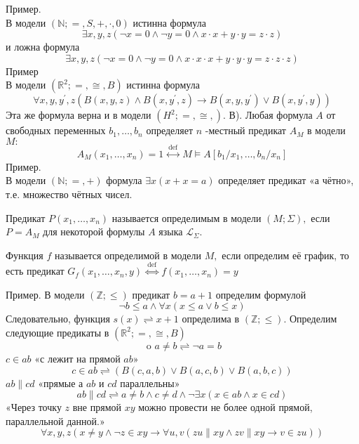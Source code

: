 \vskip 0.2in
Пример.\\
В модели $(\mathbb{N} ;=, S,+, \cdot, 0)$ истинна формула
$$\exists x, y, z(\neg x=0 \wedge \neg y=0 \wedge x \cdot x+y \cdot y=z \cdot z)$$
и ложна формула 
$$\exists x, y, z(\neg x=0 \wedge \neg y=0 \wedge x \cdot x \cdot x+y \cdot y \cdot y=z \cdot z \cdot z)$$
\vskip 0.2in
Пример\\
В модели $\left(\mathbb{R}^{2} ;=, \cong, B\right)$ истинна формула
$$\forall x, y, y^{\prime}, z\left(B(x, y, z) \wedge B\left(x, y^{\prime}, z\right) \rightarrow B\left(x, y, y^{\prime}\right) \vee B\left(x, y^{\prime}, y\right)\right)$$
Эта же формула верна и в модели $\left(H^{2} ;=, \cong,\right)$. В).
\vskip 0.2in
Любая формула $A$ от свободных переменных $b_{1}, \ldots, b_{n}$ определяет $n$ -местный предикат $A_{M}$ в модели $M:$
$$
A_{M}\left(x_{1}, \ldots, x_{n}\right)=1 \stackrel{\text { def }}{\longleftrightarrow} M \vDash A\left[b_{1} / x_{1}, \ldots, b_{n} / x_{n}\right]
$$
Пример.\\
В модели $(\mathbb{N} ;=,+)$ формула $\exists x(x+x=a)$ определяет предикат «а чётно», т.е. множество чётных чисел.
\vskip 0.2in
\begin{defn}
Предикат $P\left(x_{1}, \ldots, x_{n}\right)$ называется определимым в модели $(M ; \Sigma),$ если $P=A_{M}$ для некоторой формулы $A$ языка $\mathcal{L}_{\Sigma}$.
\end{defn}
\begin{defn}
Функция $f$ называется определимой в модели $M,$ если определим её график, то есть предикат $G_{f}\left(x_{1}, \ldots, x_{n}, y\right) \stackrel{\text { def }}{\Longleftrightarrow} f\left(x_{1}, \ldots, x_{n}\right)=y$
\end{defn}
\vskip 0.2in
Пример.
В модели $(\mathbb{Z} ; \leqslant)$ предикат $b=a+1$ определим формулой
$$
\neg b \leqslant a \wedge \forall x(x \leqslant a \vee b \leqslant x)
$$
Следовательно, функция $s(x) \rightleftharpoons x+1$ определима в $(\mathbb{Z} ; \leqslant)$.
\vskip 0.2in
Определим следующие предикаты в $\left(\mathbb{R}^{2} ;=, \cong, B\right)$
$$
\text { o } a \neq b \rightleftharpoons \neg a=b
$$
$c \in ab$ «с лежит на прямой $ab$»
$$
c \in a b \rightleftharpoons(B(c, a, b) \vee B(a, c, b) \vee B(a, b, c))
$$
$ab\|cd$ «прямые а $a b$ и $c d$ параллельны»
$$
a b \| c d \rightleftharpoons a \neq b \wedge c \neq d \wedge \neg \exists x(x \in a b \wedge x \in c d)
$$
\vskip 0.2in
«Через точку $z$ вне прямой $xy$ можно провести не более одной прямой, параллельной данной.»
$$\forall x, y, z\left(x \neq y \wedge \neg z \in x y \rightarrow \forall u, v\left(z u\|x y \wedge zv \| x y \rightarrow v \in z u\right)\right)$$
